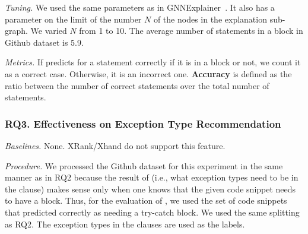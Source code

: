 {\em Tuning.} We used the same parameters as in
GNNExplainer~\cite{GNNExplainer}. It also has a parameter on the limit
of the number $N$ of the nodes in the explanation sub-graph. We
varied $N$ from 1 to 10. The average number of statements in a
 block in Github dataset is 5.9.


{\em Metrics.} If {\xstate} predicts for a statement correctly if it
is in a  block or not, we count it as a correct case.
Otherwise, it is an incorrect one. \textbf{Accuracy} is
defined as the ratio between the number of correct statements over the
total number of statements.


\subsubsection{RQ3. Effectiveness on Exception Type Recommendation\\}

{\em Baselines.} None. XRank/Xhand do not support this feature.


{\em Procedure.} We processed the Github dataset for this experiment
in the same manner as in RQ2 because the result of {\xtype} (i.e.,
what exception types need to be in the  clause) makes
sense only when one knows that the given code snippet needs to have a
 block. Thus, for the evaluation of {\xtype}, we used
the set of code snippets that {\xblock} predicted correctly as needing
a try-catch block. We used the same splitting as RQ2. The exception
types in the  clauses are used as the labels.


